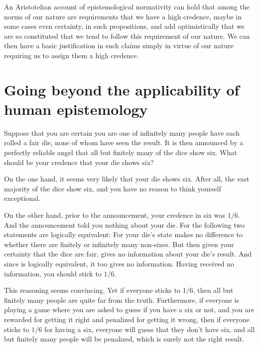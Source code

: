 An Aristotelian account of epistemological normativity can hold that among the norms of our nature are requirements that we 
have a high credence, maybe in some cases even certainty, in such propositions, and add optimistically that we are so 
constituted that we tend to follow this requirement of our nature. We can then have a basic justification in such claims 
simply in virtue of our nature requiring us to assign them a high credence.

\section{Going beyond the applicability of human epistemology}
Suppose that you are certain you are one of infinitely many people have each rolled a fair die, none of whom have seen the 
result. It is then announced by a perfectly reliable angel that all but finitely many of the dice show six. 
What should be your credence that your die shows six? 

On the one hand, it seems very likely that your die shows six. After all, the vast majority of the dice show
six, and you have no reason to think yourself exceptional. 

On the other hand, prior to the announcement, your credence in six was $1/6$. And the announcement told you nothing 
about your die. For the following two statements are logically equivalent:
For your die's state makes no difference to whether there are finitely or infinitely many non-sixes.
But then given your certainty that the dice are fair,  gives no information about 
your die's result. And since  is logically equivalent, it too gives no information.
Having received no information, you should stick to $1/6$. 

This reasoning seems convincing. Yet if everyone sticks to $1/6$, then all but finitely many people are quite far 
from the truth. Furthermore, if everyone is playing a game where you are asked to guess if you have a six or not,
and you are rewarded for getting it right and penalized for getting it wrong, then if everyone sticks to $1/6$
for having a six, everyone will guess that they don't have six, and all but finitely many people will be penalized,
which is surely not the right result.

